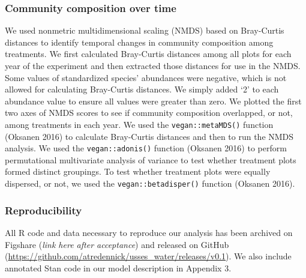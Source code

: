 \documentclass[fleqn,10pt,lineno]{wlpeerj} %
\begin{document}
\hypertarget{community-composition-over-time}{%
\subsubsection{Community composition over
time}\label{community-composition-over-time}}

We used nonmetric multidimensional scaling (NMDS) based on Bray-Curtis
distances to identify temporal changes in community composition among
treatments. We first calculated Bray-Curtis distances among all plots
for each year of the experiment and then extracted those distances for
use in the NMDS. Some values of standardized species' abundances were
negative, which is not allowed for calculating Bray-Curtis distances. We
simply added `2' to each abundance value to ensure all values were
greater than zero. We plotted the first two axes of NMDS scores to see
if community composition overlapped, or not, among treatments in each
year. We used the \texttt{vegan::metaMDS()} function (Oksanen 2016) to
calculate Bray-Curtis distances and then to run the NMDS analysis. We
used the \texttt{vegan::adonis()} function (Oksanen 2016) to perform
permutational multivariate analysis of variance to test whether
treatment plots formed distinct groupings. To test whether treatment
plots were equally dispersed, or not, we used the
\texttt{vegan::betadisper()} function (Oksanen 2016).


\hypertarget{reproducibility}{%
\subsubsection{Reproducibility}\label{reproducibility}}

All R code and data necessary to reproduce our analysis has been
archived on Figshare (\emph{link here after acceptance}) and released on
GitHub (\url{https://github.com/atredennick/usses_water/releases/v0.1}).
We also include annotated Stan code in our model description in Appendix
3.
\end{document}
